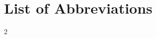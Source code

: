 
\section*{List of Abbreviations}
\begin{multicols}{2}

\begin{acronym}

\end{acronym}

\end{multicols}